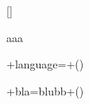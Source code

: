\documentclass[english,ngerman,ttfont=roboto]{tudscrmanual}
\begin{document}
\begin{Declaration}{[]}
\begin{Declaration}[v2.02]{}
\printdeclarationlist%
aaa
\end{Declaration}
\end{Declaration}

+language=+()

+bla=blubb+()


\clearpage
\PrintIndex
\PrintChangelog
\end{document}
